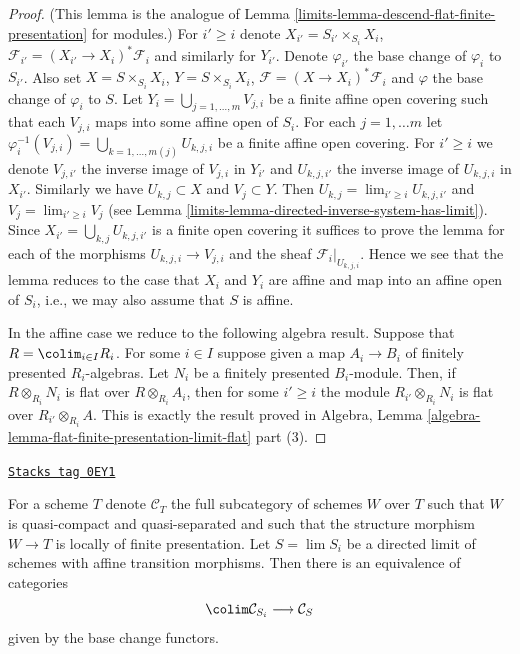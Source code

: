 \begin{proof}

(This lemma is the analogue of
Lemma \ref{limits-lemma-descend-flat-finite-presentation}
for modules.)
For $i' \geq i$ denote $X_{i'} = S_{i'} \times_{S_i} X_i$,
$\mathcal{F}_{i'} = (X_{i'} \to X_i)^*\mathcal{F}_i$ and similarly
for $Y_{i'}$. Denote $\varphi_{i'}$ the base change
of $\varphi_i$ to $S_{i'}$. Also set $X = S \times_{S_i} X_i$,
$Y =S \times_{S_i} X_i$, $\mathcal{F} = (X \to X_i)^*\mathcal{F}_i$
and $\varphi$ the base change of $\varphi_i$ to $S$.
Let $Y_i = \bigcup_{j = 1, \ldots, m} V_{j, i}$ be a finite affine open
covering such that each $V_{j, i}$ maps into some affine open of $S_i$.
For each $j = 1, \ldots m$ let
$\varphi_i^{-1}(V_{j, i}) = \bigcup_{k = 1, \ldots, m(j)} U_{k, j, i}$
be a finite affine open covering. For $i' \geq i$ we denote
$V_{j, i'}$ the inverse image of $V_{j, i}$ in $Y_{i'}$ and
$U_{k, j, i'}$ the inverse image of $U_{k, j, i}$ in $X_{i'}$.
Similarly we have $U_{k, j} \subset X$ and $V_j \subset Y$.
Then $U_{k, j} = \lim_{i' \geq i} U_{k, j, i'}$
and $V_j = \lim_{i' \geq i} V_j$
(see Lemma \ref{limits-lemma-directed-inverse-system-has-limit}).
Since $X_{i'} = \bigcup_{k, j} U_{k, j, i'}$ is a finite open covering
it suffices to prove the lemma for each of the morphisms
$U_{k, j, i} \to V_{j, i}$ and the sheaf $\mathcal{F}_i|_{U_{k, j, i}}$.
Hence we see that the lemma reduces to the case that $X_i$ and
$Y_i$ are affine and map into an affine open of $S_i$, i.e., we
may also assume that $S$ is affine.

\medskip\noindent
In the affine case we reduce to the following algebra result.
Suppose that $R = \colim_{i \in I} R_i$. For some $i \in I$
suppose given a map $A_i \to B_i$ of finitely presented $R_i$-algebras.
Let $N_i$ be a finitely presented $B_i$-module.
Then, if $R \otimes_{R_i} N_i$ is flat over $R \otimes_{R_i} A_i$,
then for some $i' \geq i$ the module
$R_{i'} \otimes_{R_i} N_i$ is flat over $R_{i'} \otimes_{R_i} A$.
This is exactly the result proved in
Algebra,
Lemma \ref{algebra-lemma-flat-finite-presentation-limit-flat} part (3).
\end{proof}

\begin{lemma}
\label{limits-lemma-descend-finite-presentation-variant}
\href{https://stacks.math.columbia.edu/tag/0EY1}{\texttt{Stacks tag 0EY1}}

For a scheme $T$ denote $\mathcal{C}_T$ the full subcategory of
schemes $W$ over $T$ such that $W$ is quasi-compact and quasi-separated
and such that the structure morphism $W \to T$ is
locally of finite presentation.
Let $S = \lim S_i$ be a directed limit of schemes with affine
transition morphisms. Then there is an equivalence
of categories
$$
\colim \mathcal{C}_{S_i} \longrightarrow \mathcal{C}_S
$$
given by the base change functors.
\end{lemma}

